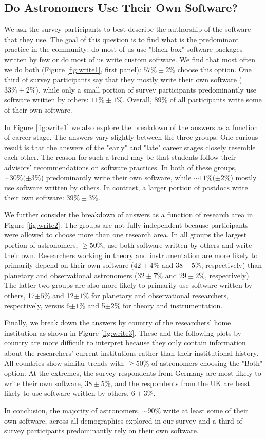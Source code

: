 \subsection{Do Astronomers Use Their Own Software?}

We ask the survey participants to best describe the authorship of the software that they use. The goal of this question is to find what is the predominant practice in the community: do most of us use "black box" software packages written by few or do most of us write custom software. We find that most often we do both (Figure \ref{fig:write1}, first panel): $57\%\pm2\%$ choose this option. One third of survey participants say that they mostly write their own software ($33\%\pm2\%$), while only a small portion of survey participants predominantly use software written by others: $11\%\pm1\%$. Overall, 89\% of all participants write some of their own software.

In Figure \ref{fig:write1} we also explore the breakdown of the answers as a function of career stage. The answers vary slightly between the three groups. One curious result is that the answers of the "early" and "late" career stages closely resemble each other. The reason for such a trend may be that students follow their advisors' recommendations on software practices. In both of these groups, $\sim30\%(\pm3\%$) predominantly write their own software, while $\sim11\%(\pm2\%$) mostly use software written by others. In contrast, a larger portion of postdocs write their own software: $39\%\pm3\%$. 

We further consider the breakdown of answers as a function of research area in Figure \ref{fig:write2}. The groups are not fully independent because participants were allowed to choose more than one research area. In all groups the largest portion of astronomers, $\ge50\%$, use both software written by others and write their own. Researchers working in theory and instrumentation are more likely to primarily depend on their own software ($42\pm4\%$ and $38\pm5\%$, respectively) than planetary and observational astronomers ($32\pm7\%$ and $29\pm2\%$, respectively). The latter two groups are also more likely to primarily use software written by others, 17$\pm5\%$ and 12$\pm1\%$ for planetary and observational researchers, respectively, versus 6$\pm1\%$ and 5$\pm2\%$ for theory and instrumentation.

Finally, we break down the answers by country of the researchers' home institution as shown in Figure \ref{fig:write3}. These and the following plots by country are more difficult to interpret because they only contain information about the researchers' current institutions rather than their institutional history. All countries show similar trends with $\ge50\%$ of astronomers choosing the "Both" option. At the extremes, the survey respondents from Germany are most likely to write their own software, $38\pm5\%$, and the respondents from the UK are least likely to use software written by others, $6\pm3\%$.

In conclusion, the majority of astronomers, $\sim90\%$ write at least some of their own software, across all demographics explored in our survey and a third of survey participants predominantly rely on their own software.  
    
    